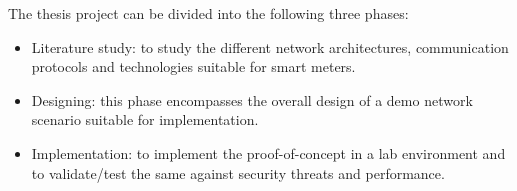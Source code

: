 The thesis project can be divided into the following three phases:
\begin{itemize}
\item Literature study: to study the different network architectures, communication protocols and technologies suitable for smart meters. 
\item Designing: this phase encompasses the overall design of a demo network scenario suitable for implementation.
\item Implementation: to implement the proof-of-concept in a lab environment and to validate/test the same against security threats and performance.
\end{itemize}